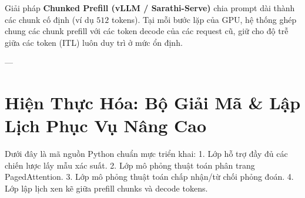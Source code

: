 Giải pháp \textbf{Chunked Prefill (vLLM / Sarathi-Serve)} chia prompt dài thành các chunk cố định (ví dụ $512$ tokens). Tại mỗi bước lặp của GPU, hệ thống ghép chung các chunk prefill với các token decode của các request cũ, giữ cho độ trễ giữa các token (ITL) luôn duy trì ở mức ổn định.

---

\section{Hiện Thực Hóa: Bộ Giải Mã \& Lập Lịch Phục Vụ Nâng Cao}
\label{sec:ch07-implementation}

Dưới đây là mã nguồn Python chuẩn mực triển khai:
1. Lớp  hỗ trợ đầy đủ các chiến lược lấy mẫu xác suất.
2. Lớp  mô phỏng thuật toán phân trang PagedAttention.
3. Lớp  mô phỏng thuật toán chấp nhận/từ chối phỏng đoán.
4. Lớp  lập lịch xen kẽ giữa prefill chunks và decode tokens.

